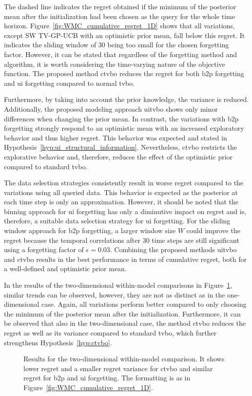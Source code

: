 The dashed line indicates the regret obtained if the minimum of the posterior mean after the initialization had been chosen as the query for the whole time horizon. Figure~\ref{fig:WMC_cumulative_regret_1D} shows that all variations, except SW TV-GP-UCB with an optimistic prior mean, fall below this regret. It indicates the sliding window of $30$ being too small for the chosen forgetting factor. However, it can be stated that regardless of the forgetting method and algorithm, it is worth considering the time-varying nature of the objective function.
The proposed method \gls{ctvbo} reduces the regret for both \gls{b2p} forgetting and \gls{ui} forgetting compared to normal \gls{tvbo}. 

Furthermore, by taking into account the prior knowledge, the variance is reduced. Additionally, the proposed modeling approach \gls{uitvbo} shows only minor differences when changing the prior mean. In contrast, the variations with \gls{b2p} forgetting strongly respond to an optimistic mean with an increased exploratory behavior and thus higher regret. This behavior was expected and stated in  Hypothesis~\ref{hyp:ui_structural_information}. Nevertheless, \gls{ctvbo} restricts the explorative behavior and, therefore, reduces the effect of the optimistic prior compared to standard \gls{tvbo}.

The data selection strategies consistently result in worse regret compared to the variations using all queried data. This behavior is expected as the posterior at each time step is only an approximation. However, it should be noted that the binning approach for \gls{ui} forgetting has only a diminutive impact on regret and is, therefore, a suitable data selection strategy for \gls{ui} forgetting. For the sliding window approach for \gls{b2p} forgetting, a larger window size $W$ could improve the regret because the temporal correlations after $30$ time steps are still significant using a forgetting factor of $\epsilon =0.03$. Combining the proposed methods \gls{uitvbo} and \gls{ctvbo} results in the best performance in terms of cumulative regret, both for a well-defined and optimistic prior mean.

In the results of the two-dimensional within-model comparisons in Figure~\ref{fig:WMC_cumulative_regret_2D}, similar trends can be observed, however, they are not as distinct as in the one-dimensional case. Again, all variations perform better compared to only choosing the minimum of the posterior mean after the initialization. Furthermore, it can be observed that also in the two-dimensional case, the method \gls{ctvbo} reduces the regret as well as its variance compared to standard \gls{tvbo}, which further strengthens Hypothesis~\ref{hyp:ctvbo}. 
\begin{figure}[h]
    \centering
    
    \caption[Results of the two-dimensional within model comparison.]{Results for the two-dimensional within-model comparison. It shows lower regret and a smaller regret variance for \gls{ctvbo} and similar regret for \gls{b2p} and \gls{ui} forgetting. The formatting is as in Figure~\ref{fig:WMC_cumulative_regret_1D}.}
    \label{fig:WMC_cumulative_regret_2D}
\end{figure}

